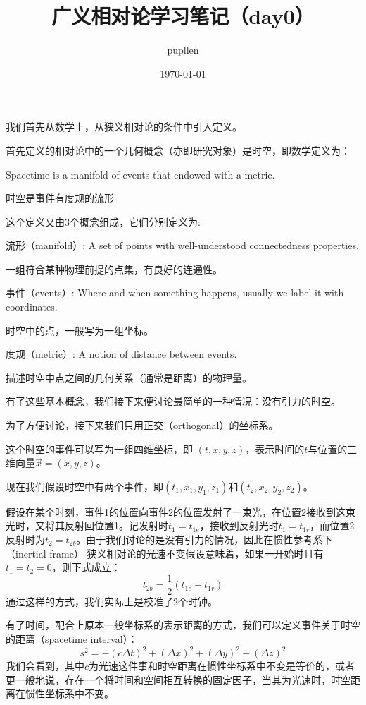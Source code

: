 \documentclass[fontset=windows]{article}
\title{\heiti\zihao{2} 广义相对论学习笔记（day0）}
\author{\songti pupllen}
\date{\today}
\begin{document}
	\maketitle
我们首先从数学上，从狭义相对论的条件中引入定义。

首先定义的相对论中的一个几何概念（亦即研究对象）是时空，即数学定义为：

Spacetime is a manifold of events that endowed with a  metric.

时空是事件有度规的流形

这个定义又由3个概念组成，它们分别定义为:

流形（manifold）: A set of points with well-understood connectedness properties.

一组符合某种物理前提的点集，有良好的连通性。

事件（events）: Where and when something happens, usually we label it with coordinates.

时空中的点，一般写为一组坐标。

度规（metric）: A notion of distance between events.

描述时空中点之间的几何关系（通常是距离）的物理量。

\hspace*{\fill}

有了这些基本概念，我们接下来便讨论最简单的一种情况：没有引力的时空。

为了方便讨论，接下来我们只用正交（orthogonal）的坐标系。

这个时空的事件可以写为一组四维坐标，即
$(t,x,y,z)$，表示时间的$t$与位置的三维向量$\vec{x} = (x,y,z)$。

\hspace*{\fill}

现在我们假设时空中有两个事件，即$(t_1,x_1,y_1,z_1)$和$(t_2,x_2,y_2,z_2)$。%

假设在某个时刻，事件1的位置向事件2的位置发射了一束光，在位置2接收到这束光时，又将其反射回位置1。记发射时$t_1 = t_{1e}$，接收到反射光时$t_1 = t_{1r}$，而位置2反射时为$t_2 = t_{2b}$。由于我们讨论的是没有引力的情况，因此在惯性参考系下（inertial frame）
狭义相对论的光速不变假设意味着，如果一开始时且有$t_1 = t_2 = 0$，则下式成立：
\begin{equation}
	t_{2b} = \frac{1}{2}(t_{1e}+t_{1r})
\end{equation}
通过这样的方式，我们实际上是校准了2个时钟。

有了时间，配合上原本一般坐标系的表示距离的方式，我们可以定义事件关于时空的距离（spacetime interval）：
\begin{equation}
	s^2 = -(c\Delta t)^2 + (\Delta x)^2 + (\Delta y)^2 + (\Delta z)^2
\end{equation}
我们会看到，其中$c$为光速这件事和时空距离在惯性坐标系中不变是等价的，或者更一般地说，存在一个将时间和空间相互转换的固定因子，当其为光速时，时空距离在惯性坐标系中不变。
\end{document}
